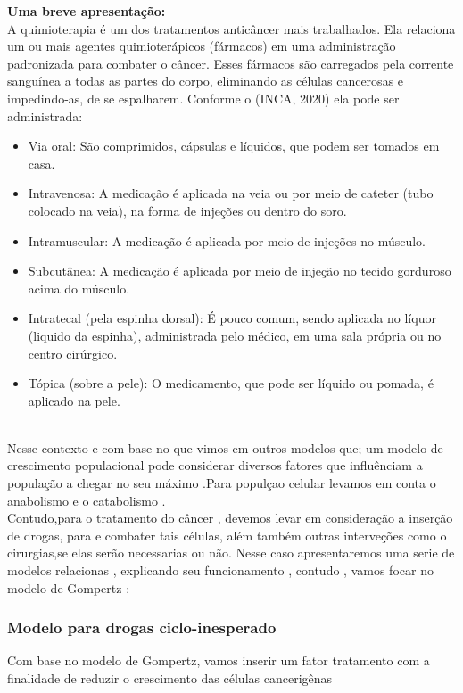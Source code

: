 \textbf{Uma breve apresentação:}
\\
A quimioterapia é um dos tratamentos anticâncer mais trabalhados. Ela relaciona um ou mais agentes quimioterápicos (fármacos) em uma administração padronizada para combater o câncer. Esses fármacos são carregados pela corrente sanguínea a todas as partes do corpo, eliminando as células cancerosas e impedindo-as, de se espalharem. Conforme o (INCA, 2020) ela pode ser administrada:
\begin{itemize}
    \item Via oral: São comprimidos, cápsulas e líquidos, que podem ser tomados em casa.
    \item Intravenosa: A medicação é aplicada na veia ou por meio de cateter (tubo colocado na veia), na forma de injeções ou dentro do soro.
    \item Intramuscular: A medicação é aplicada por meio de injeções no músculo.
    \item Subcutânea: A medicação é aplicada por meio de injeção no tecido gorduroso acima do músculo.
    \item Intratecal (pela espinha dorsal): É pouco comum, sendo aplicada no líquor (liquido da espinha), administrada pelo médico, em uma sala própria ou no centro cirúrgico.
    \item Tópica (sobre a pele): O medicamento, que pode ser líquido ou pomada, é aplicado na pele.
\end{itemize}

\\
  Nesse contexto e com base no que vimos em outros modelos que; um modelo de crescimento populacional pode considerar diversos fatores que influênciam a população a chegar no seu máximo .Para populçao celular levamos em conta o anabolismo e o catabolismo .\\
 Contudo,para o tratamento do câncer , devemos levar em consideração a inserção de drogas, para e combater tais células, além também outras interveções como o cirurgias,se elas serão necessarias ou não. Nesse caso apresentaremos uma serie de modelos relacionas , explicando seu funcionamento , contudo , vamos focar no modelo de Gompertz :

\subsubsection{Modelo para drogas ciclo-inesperado}
 Com base no modelo de Gompertz, vamos inserir um fator  tratamento  com a finalidade de reduzir o crescimento das células cancerigênas
 
